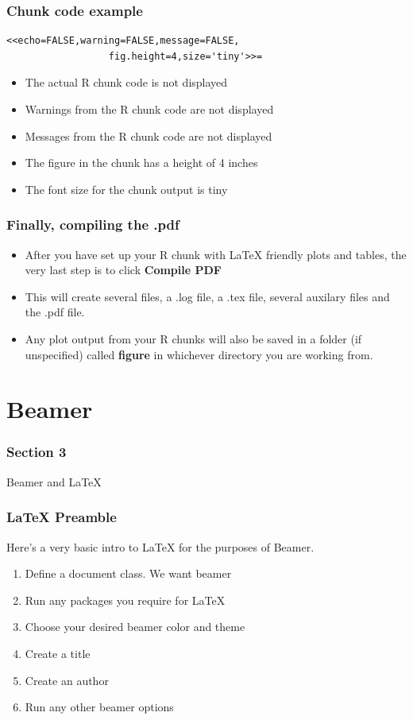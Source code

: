 \documentclass[nogin]{beamer}\usepackage[]{graphicx}\usepackage[]{color}
\begin{document}
\begin{frame}[fragile]
\frametitle{Chunk code example}
\begin{verbatim}<<echo=FALSE,warning=FALSE,message=FALSE,
                  fig.height=4,size='tiny'>>=\end{verbatim}
\begin{itemize}
\item The actual R chunk code is not displayed
\item Warnings from the R chunk code are not displayed
\item Messages from the R chunk code are not displayed
\item The figure in the chunk has a height of 4 inches
\item The font size for the chunk output is {\tiny tiny}
\end{itemize}
\end{frame}

\begin{frame}
\frametitle{Finally, compiling the .pdf}
\begin{itemize}
\item After you have set up your R chunk with LaTeX friendly plots and tables, the very last step is to click \textbf{Compile PDF}
\item This will create several files, a .log file, a .tex file, several auxilary files and the .pdf file.
\item Any plot output from your R chunks will also be saved in a folder (if unspecified) called \textbf{figure} in whichever directory you are working from.
\end{itemize}
\end{frame}

\section{Beamer}
\begin{frame}
\frametitle{Section 3}
\begin{center}
\Large
Beamer and LaTeX
\end{center}
\end{frame}

\begin{frame}[fragile]
\frametitle{LaTeX Preamble}
Here's a very basic intro to LaTeX for the purposes of Beamer.
\begin{enumerate}
\item Define a document class. We want beamer
\item Run any packages you require for LaTeX
\item Choose your desired beamer color and theme
\item Create a title
\item Create an author
\item Run any other beamer options
\end{enumerate}
\end{frame}
\end{document}
